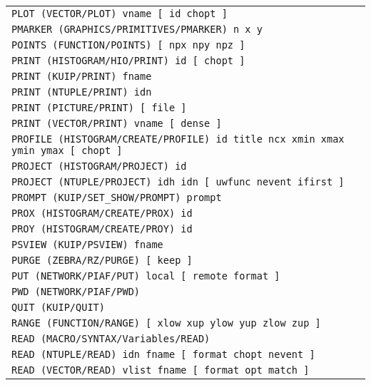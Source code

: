 \begin{longtable}{|>{\footnotesize\tt}lr|}
PLOT (VECTOR/PLOT)  vname [ id chopt ] & \pageref{ref:VECTOR/PLOT}\\ 
PMARKER (GRAPHICS/PRIMITIVES/PMARKER)  n x y & \pageref{ref:GRAPHICS/PRIMITIVES/PMARKER}\\ 
POINTS (FUNCTION/POINTS)  [ npx npy npz ] & \pageref{ref:FUNCTION/POINTS}\\ 
PRINT (HISTOGRAM/HIO/PRINT)  id [ chopt ] & \pageref{ref:HISTOGRAM/HIO/PRINT}\\ 
PRINT (KUIP/PRINT)  fname & \pageref{ref:KUIP/PRINT}\\ 
PRINT (NTUPLE/PRINT)  idn & \pageref{ref:NTUPLE/PRINT}\\ 
PRINT (PICTURE/PRINT)  [ file ] & \pageref{ref:PICTURE/PRINT}\\ 
PRINT (VECTOR/PRINT)  vname [ dense ] & \pageref{ref:VECTOR/PRINT}\\ 
PROFILE (HISTOGRAM/CREATE/PROFILE)  id title ncx xmin xmax ymin ymax [ chopt ] & \pageref{ref:HISTOGRAM/CREATE/PROFILE}\\ 
PROJECT (HISTOGRAM/PROJECT)  id & \pageref{ref:HISTOGRAM/PROJECT}\\ 
PROJECT (NTUPLE/PROJECT)  idh idn [ uwfunc nevent ifirst ] & \pageref{ref:NTUPLE/PROJECT}\\ 
PROMPT (KUIP/SET_SHOW/PROMPT)  prompt & \pageref{ref:KUIP/SET_SHOW/PROMPT}\\ 
PROX (HISTOGRAM/CREATE/PROX)  id & \pageref{ref:HISTOGRAM/CREATE/PROX}\\ 
PROY (HISTOGRAM/CREATE/PROY)  id & \pageref{ref:HISTOGRAM/CREATE/PROY}\\ 
PSVIEW (KUIP/PSVIEW)  fname & \pageref{ref:KUIP/PSVIEW}\\ 
PURGE (ZEBRA/RZ/PURGE)  [ keep ] & \pageref{ref:ZEBRA/RZ/PURGE}\\ 
PUT (NETWORK/PIAF/PUT)  local [ remote format ] & \pageref{ref:NETWORK/PIAF/PUT}\\ 
PWD (NETWORK/PIAF/PWD)  & \pageref{ref:NETWORK/PIAF/PWD}\\ 
QUIT (KUIP/QUIT)  & \pageref{ref:KUIP/QUIT}\\ 
RANGE (FUNCTION/RANGE)  [ xlow xup ylow yup zlow zup ] & \pageref{ref:FUNCTION/RANGE}\\ 
READ (MACRO/SYNTAX/Variables/READ)  & \pageref{ref:MACRO/SYNTAX/Variables/READ}\\ 
READ (NTUPLE/READ)  idn fname [ format chopt nevent ] & \pageref{ref:NTUPLE/READ}\\ 
READ (VECTOR/READ)  vlist fname [ format opt match ] & \pageref{ref:VECTOR/READ}\\ 

\end{longtable}
